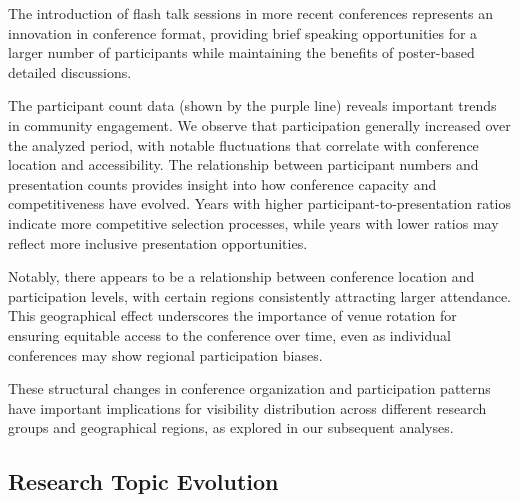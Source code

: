 \documentclass[a4paper,11pt]{article}
\begin{document}
The introduction of flash talk sessions in more recent conferences represents an innovation in conference format, providing brief speaking opportunities for a larger number of participants while maintaining the benefits of poster-based detailed discussions.

The participant count data (shown by the purple line) reveals important trends in community engagement. We observe that participation generally increased over the analyzed period, with notable fluctuations that correlate with conference location and accessibility. The relationship between participant numbers and presentation counts provides insight into how conference capacity and competitiveness have evolved. Years with higher participant-to-presentation ratios indicate more competitive selection processes, while years with lower ratios may reflect more inclusive presentation opportunities.

Notably, there appears to be a relationship between conference location and participation levels, with certain regions consistently attracting larger attendance. This geographical effect underscores the importance of venue rotation for ensuring equitable access to the conference over time, even as individual conferences may show regional participation biases.

These structural changes in conference organization and participation patterns have important implications for visibility distribution across different research groups and geographical regions, as explored in our subsequent analyses.

\subsection{Research Topic Evolution}
\end{document}

